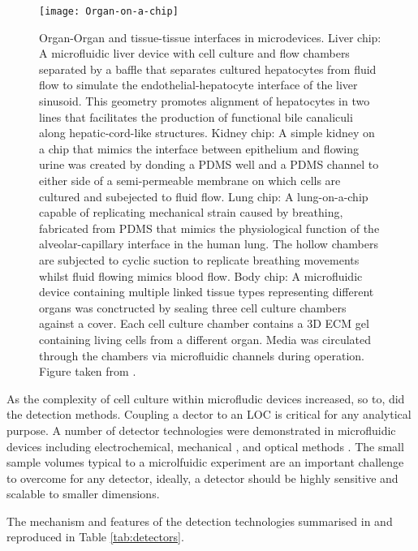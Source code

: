 \begin{figure}
  \begin{center}
  \texttt{[image: Organ-on-a-chip]}
  \end{center}
  \caption{Organ-Organ and tissue-tissue interfaces in microdevices. Liver chip: A microfluidic liver device with cell culture and flow chambers separated by
  a baffle that separates cultured hepatocytes from fluid flow to simulate the endothelial-hepatocyte interface of the liver sinusoid. This geometry promotes alignment
  of hepatocytes in two lines that facilitates the production of functional bile canaliculi along hepatic-cord-like structures\citep{nakao2011bile}. Kidney chip:
  A simple kidney on a chip that mimics the interface between epithelium and flowing urine was created by donding a PDMS well and a PDMS channel to either side
  of a semi-permeable membrane on which cells are cultured and subejected to fluid flow\citep{jang2010multi}. Lung chip: A lung-on-a-chip capable of replicating mechanical
  strain caused by breathing, fabricated from PDMS that mimics the physiological function of the alveolar-capillary interface in the human lung. The hollow chambers
  are subjected to cyclic suction to replicate breathing movements whilst fluid flowing mimics blood flow\citep{huh2010reconstituting}. Body chip: A
  microfluidic device containing multiple linked tissue types representing different organs was conctructed by sealing three cell culture chambers against a cover. Each
  cell culture chamber contains a 3D ECM gel containing living cells from a different organ. Media was circulated through the chambers via microfluidic channels
  during operation\citep{sung2009micro}. Figure taken from \citep{huh2012microengineered}.}
  \label{fig:OrganChip}
\end{figure}

As the complexity of cell culture within microfludic devices increased, so to, did the detection methods. Coupling
a dector to an LOC is critical for any analytical purpose. A number of detector technologies were demonstrated in
microfluidic devices including electrochemical\citep{wang2006electrochemical}, mechanical \citep{raiteri2001micromechanical},
and optical methods \citep{kuswandi2007optical}. The small sample volumes typical to a microlfuidic experiment
are an important challenge to overcome for any detector, ideally, a detector should be highly sensitive and scalable
to smaller dimensions.

The mechanism and features of the detection technologies summarised in \citep{pires2014recent} and
reproduced in Table \ref{tab:detectors}.

